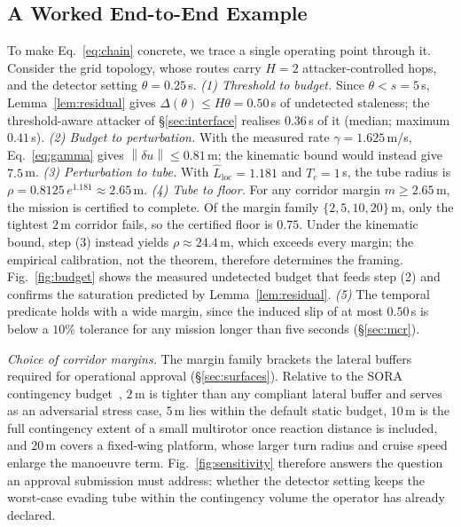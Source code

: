 \documentclass[conference,letterpaper,10pt]{IEEEtran}   %
\newcommand{\Norm}[1]{\left\lVert #1\right\rVert}
\begin{document}
\subsection{A Worked End-to-End Example}
\label{sec:worked}
To make Eq.~\eqref{eq:chain} concrete, we trace a single operating point through
it. Consider the grid topology, whose routes carry $H=2$ attacker-controlled
hops, and the detector setting $\theta=0.25$\,s. \emph{(1) Threshold to budget.}
Since $\theta<s=5$\,s, Lemma~\ref{lem:residual} gives
$\Delta(\theta)\le H\theta=0.50$\,s of undetected staleness; the
threshold-aware attacker of \S\ref{sec:interface} realises $0.36$\,s of it
(median; maximum $0.41$\,s). \emph{(2) Budget to perturbation.} With the
measured rate $\gamma=1.625$\,m/s, Eq.~\eqref{eq:gamma} gives
$\Norm{\delta u}\le0.81$\,m; the kinematic bound would instead give $7.5$\,m.
\emph{(3) Perturbation to tube.} With $\hat L_{\mathrm{loc}}=1.181$ and
$T_c=1$\,s, the tube radius is $\rho=0.8125\,e^{1.181}\approx2.65$\,m.
\emph{(4) Tube to floor.} For any corridor margin $m\ge2.65$\,m, the mission is
certified to complete. Of the margin family $\{2,5,10,20\}$\,m, only the
tightest $2$\,m corridor fails, so the certified floor is $0.75$. Under the
kinematic bound, step (3) instead yields $\rho\approx24.4$\,m, which exceeds
every margin; the empirical calibration, not the theorem, therefore determines
the framing. Fig.~\ref{fig:budget} shows the measured undetected budget that
feeds step (2) and confirms the saturation predicted by
Lemma~\ref{lem:residual}. \emph{(5)} The temporal predicate holds with a wide
margin, since the induced slip of at most $0.50$\,s is below a $10\%$ tolerance
for any mission longer than five seconds (\S\ref{sec:mcr}).

\emph{Choice of corridor margins.} The margin family brackets the lateral
buffers required for operational approval (\S\ref{sec:surfaces}). Relative to
the SORA contingency budget~\cite{jarus_sora25,easa_uspace2021}, $2$\,m is
tighter than any compliant lateral buffer and serves as an adversarial stress
case, $5$\,m lies within the default static budget, $10$\,m is the full
contingency extent of a small multirotor once reaction distance is included,
and $20$\,m covers a fixed-wing platform, whose larger turn radius and cruise
speed enlarge the manoeuvre term. Fig.~\ref{fig:sensitivity} therefore answers
the question an approval submission must address: whether the detector setting
keeps the worst-case evading tube within the contingency volume the operator
has already declared.
\end{document}
